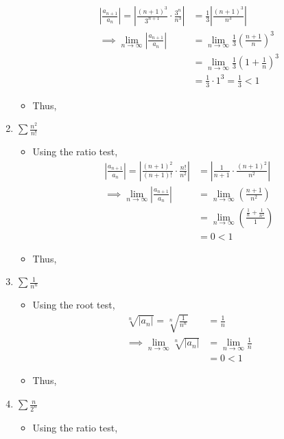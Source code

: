 \documentclass[10pt,a4paper]{article}
\theoremstyle{definition}
\begin{document}
\begin{enumerate}[label = (\alph*)]
\begin{itemize}
	\begin{align*}
	\left|\frac{a_{n+1}}{a_n}\right| = \left|\frac{(n+1)^3}{3^{n+1}} \cdot \frac{3^n}{n^3}\right| &= \frac{1}{3}\left|\frac{(n + 1)^3}{n^3}\right|\\
	\implies \lim_{n \to \infty} \left|\frac{a_{n+1}}{a_n}\right| &= \lim_{n \to \infty} \frac{1}{3}\left(\frac{n + 1}{n}\right)^3\\
	&= \lim_{n \to \infty}\frac{1}{3}\left(1 + \frac{1}{n}\right)^3\\
	&= \frac{1}{3} \cdot 1^3 = \frac{1}{3} < 1
	\end{align*}
	\item Thus, 
	\end{itemize}
\item $\displaystyle \sum \frac{n^2}{n!}$
	\begin{itemize}
	\item Using the ratio test, 
	\begin{align*}
	\left|\frac{a_{n+1}}{a_n}\right| = \left|\frac{(n+1)^2}{(n+1)!} \cdot \frac{n!}{n^2}\right| &= \left|\frac{1}{n + 1} \cdot \frac{(n + 1)^2}{n^2}\right|\\
	\implies \lim_{n \to \infty} \left|\frac{a_{n+1}}{a_n}\right| &= \lim_{n \to \infty} \left(\frac{n + 1}{n^2}\right)\\
	&= \lim_{n \to \infty} \left(\frac{\frac{1}{n} + \frac{1}{n^2}}{1}\right)\\
	&= 0 < 1
	\end{align*}
	\item Thus, 
	\end{itemize}
\item $\displaystyle \sum\frac{1}{n^n}$
	\begin{itemize}
	\item Using the root test,
	\begin{align*}
	\sqrt[n]{|a_n|} = \sqrt[n]{\frac{1}{n^n}} &= \frac{1}{n}\\
	\implies \lim_{n \to \infty} \sqrt[n]{|a_n|} &= \lim_{n \to \infty} \frac{1}{n}\\
	&= 0 < 1
	\end{align*}
	\item Thus, 
	\end{itemize}
\item $\displaystyle \sum \frac{n}{2^n}$
	\begin{itemize}
	\item Using the ratio test,

\end{itemize}
\end{enumerate}
\end{document}
